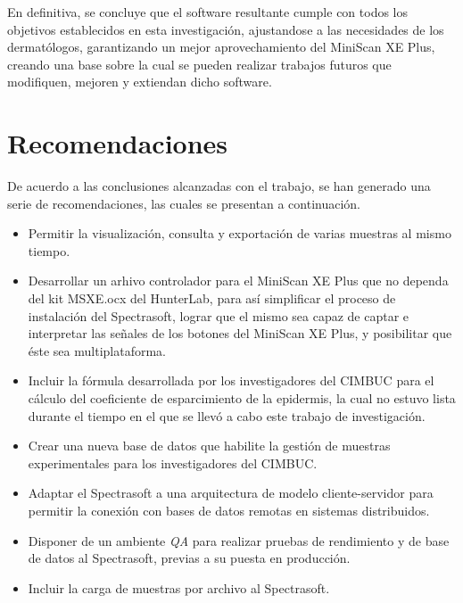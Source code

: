 	En definitiva, se concluye que el software resultante cumple con todos los objetivos establecidos en esta investigaci\'{o}n, ajustandose a las necesidades de los dermat\'{o}logos, garantizando un mejor aprovechamiento del MiniScan XE Plus, creando una base sobre la cual se pueden realizar trabajos futuros que modifiquen, mejoren y extiendan dicho software.

\newpage

\section{Recomendaciones}

	De acuerdo a las conclusiones alcanzadas con el trabajo, se han generado una serie de recomendaciones, las cuales se presentan a continuaci\'{o}n.

\begin{itemize}

	\item Permitir la visualizaci\'{o}n, consulta y exportaci\'{o}n de varias muestras al mismo tiempo.
	
	\item Desarrollar un arhivo controlador para el MiniScan XE Plus que no dependa del kit MSXE.ocx del HunterLab, para as\'{i} simplificar el proceso de instalaci\'{o}n del Spectrasoft, lograr que el mismo sea capaz de captar e interpretar las se\~{n}ales de los botones del MiniScan XE Plus, y posibilitar que \'{e}ste sea multiplataforma.
	
	\item Incluir la f\'{o}rmula desarrollada por los investigadores del CIMBUC para el c\'{a}lculo del coeficiente de esparcimiento de la epidermis, la cual no estuvo lista durante el tiempo en el que se llev\'{o} a cabo este trabajo de investigaci\'{o}n.
	
	\item Crear una nueva base de datos que habilite la gesti\'{o}n de muestras experimentales para los investigadores del CIMBUC.
	
	\item Adaptar el Spectrasoft a una arquitectura de modelo cliente-servidor para permitir la conexi\'{o}n con bases de datos remotas en sistemas distribuidos.
	
	\item Disponer de un ambiente \textit{QA} para realizar pruebas de rendimiento y de base de datos al Spectrasoft, previas a su puesta en producci\'{o}n.
	
	\item Incluir la carga de muestras por archivo al Spectrasoft.
\end{itemize}